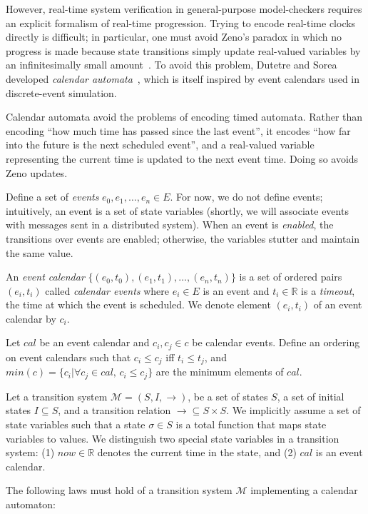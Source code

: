 \documentclass{llncs/llncs}
\begin{document}
However, real-time system verification in general-purpose model-checkers requires an explicit formalism of real-time progression. Trying to encode real-time clocks directly is difficult; in particular, one must avoid Zeno's paradox in which no progress is made because state transitions simply update real-valued variables by an infinitesimally small amount~\cite{bruno,lamport}. To avoid this problem, Dutetre and Sorea developed \emph{calendar automata}~\cite{bruno}, which is itself inspired by event calendars used in discrete-event simulation.

Calendar automata avoid the problems of encoding timed automata. Rather than encoding ``how much time has passed since the last event'', it encodes ``how far into the future is the next scheduled event'', and a real-valued variable representing the current time is updated to the next event time. Doing so avoids Zeno updates.

Define a set of \emph{events} $e_0, e_1, \ldots, e_n \in E$. For now, we do not define events; intuitively, an event is a set of state variables (shortly, we will associate events with messages sent in a distributed system). When an event is \emph{enabled}, the transitions over events are enabled; otherwise, the variables stutter and maintain the same value.

An \emph{event calendar} $\{ (e_0, t_0), (e_1, t_1), \ldots, (e_n, t_n) \}$ is a set of ordered pairs $(e_i, t_i)$ called \emph{calendar events} where $e_i \in E$ is an event and $t_i \in \mathbb{R}$ is a \emph{timeout}, the time at which the event is scheduled. We denote element $(e_i, t_i)$ of an event calendar by $c_i$.

Let $cal$ be an event calendar and $c_i, c_j \in c$ be calendar events. Define an ordering on event calendars such that $c_i \leq c_j$ iff $t_i \leq t_j$, and $min(c) = \{ c_i | \forall c_j \in cal, \, c_i \leq c_j  \}$ are the minimum elements of $cal$.

Let a transition system $\mathcal{M} = (S, I, \rightarrow)$, be a set of states $S$, a set of initial states $I \subseteq S$, and a transition relation $\rightarrow \subseteq S \times S$. We implicitly assume a set of state variables such that a state $\sigma \in S$ is a total function that maps state variables to values. We distinguish two special state variables in a transition system: (1) $now \in \mathbb{R}$ denotes the current time in the state, and (2) $cal$ is an event calendar.

The following laws must hold of a transition system $\mathcal{M}$ implementing a calendar automaton:
\end{document}

